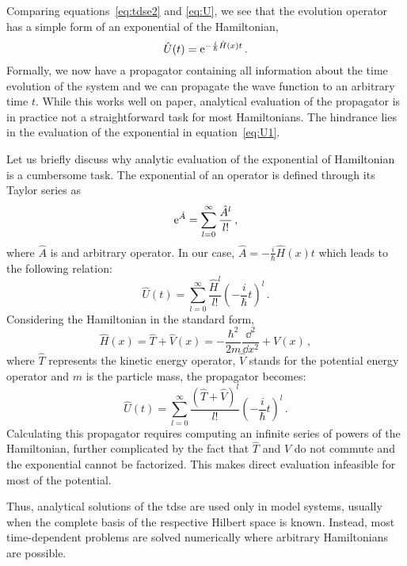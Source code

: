 Comparing equations~\eqref{eq:tdse2} and \eqref{eq:U}, we see that the evolution operator has a simple form of an exponential of the Hamiltonian,
\begin{equation}
    \hat{U}(t) = \mathrm{e}^{-\frac{i}{\hbar}\hat{H}(x)t} \, .
    \label{eq:U1}
\end{equation}
Formally, we now have a propagator containing all information about the time evolution of the system and we can propagate the wave function to an arbitrary time $t$. While this works well on paper, analytical evaluation of the propagator is in practice not a straightforward task for most Hamiltonians. The hindrance lies in the evaluation of the exponential in equation~\eqref{eq:U1}.

Let us briefly discuss why analytic evaluation of the exponential of Hamiltonian is a cumbersome task. The exponential of an operator is defined through its Taylor series as
\begin{equation}
    \mathrm{e}^{\hat{A}} = \sum_{l=0}^\infty \frac{\hat{A}^l}{l!} \, ,
\end{equation}
where $\hat{A}$ is and arbitrary operator. In our case, $\hat{A} = -\frac{i}{\hbar}\hat{H}(x)t$ which leads to the following relation:
\begin{equation}
    \hat{U}(t) = \sum_{l=0}^\infty \frac{\hat{H}^l}{l!} \left( -\frac{i}{\hbar} t\right)^l \, .
    \label{eq:U2}
\end{equation}
Considering the Hamiltonian in the standard form,
\begin{equation}
    \hat{H}(x) = \hat{T} + \hat{V}(x) = -\frac{\hbar^2}{2m}\frac{\dd^2}{\dd x^2} + V(x)\, ,
    \label{eq:Ham1}
\end{equation}
where $\hat{T}$ represents the kinetic energy operator, $\hat{V}$ stands for the potential energy operator and $m$ is the particle mass, the propagator becomes:
\begin{equation}
    \hat{U}(t) = \sum_{l=0}^\infty \frac{(\hat{T}+\hat{V})^l}{l!} \left( -\frac{i}{\hbar} t\right)^l \, .
    \label{eq:U3}
\end{equation}
Calculating this propagator requires computing an infinite series of powers of the Hamiltonian, further complicated by the fact that $\hat{T}$ and $\hat{V}$ do not commute and the exponential cannot be factorized. This makes direct evaluation infeasible for most of the potential.

Thus, analytical solutions of the \acrshort{tdse} are used only in model systems, usually when the complete basis of the respective Hilbert space is known. Instead, most time-dependent problems are solved numerically where arbitrary Hamiltonians are possible. 

